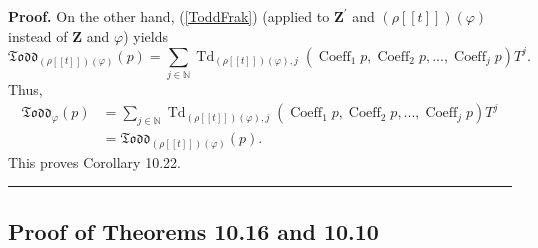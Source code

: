 \documentclass[numbers=enddot,12pt,final,onecolumn,notitlepage]{scrartcl}%
\newenvironment{proof}[1][Proof]{\noindent\textbf{#1.} }{\ \rule{0.5em}{0.5em}}
\begin{document}
\begin{proof}
On the other hand, (\ref{ToddFrak}) (applied to $\mathbf{Z}^{\prime}$ and
$\left(  \rho\left[  \left[  t\right]  \right]  \right)  \left(
\varphi\right)  $ instead of $\mathbf{Z}$ and $\varphi$) yields
\[
\mathfrak{Todd}_{\left(  \rho\left[  \left[  t\right]  \right]  \right)
\left(  \varphi\right)  }\left(  p\right)  =\sum\limits_{j\in\mathbb{N}%
}\operatorname*{Td}\nolimits_{\left(  \rho\left[  \left[  t\right]  \right]
\right)  \left(  \varphi\right)  ,j}\left(  \operatorname*{Coeff}%
\nolimits_{1}p,\operatorname*{Coeff}\nolimits_{2}p,...,\operatorname*{Coeff}%
\nolimits_{j}p\right)  T^{j}.
\]
Thus,%
\begin{align*}
\mathfrak{Todd}_{\varphi}\left(  p\right)   &  =\sum\limits_{j\in\mathbb{N}%
}\operatorname*{Td}\nolimits_{\left(  \rho\left[  \left[  t\right]  \right]
\right)  \left(  \varphi\right)  ,j}\left(  \operatorname*{Coeff}%
\nolimits_{1}p,\operatorname*{Coeff}\nolimits_{2}p,...,\operatorname*{Coeff}%
\nolimits_{j}p\right)  T^{j}\\
&  =\mathfrak{Todd}_{\left(  \rho\left[  \left[  t\right]  \right]  \right)
\left(  \varphi\right)  }\left(  p\right)  .
\end{align*}
This proves Corollary 10.22.
\end{proof}

\subsection{Proof of Theorems 10.16 and 10.10}
\end{document}

